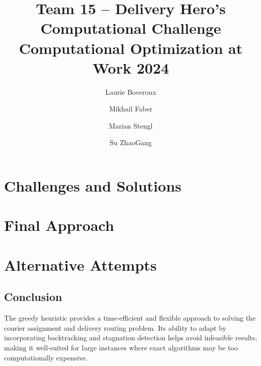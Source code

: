 \documentclass[a4paper]{article}
\title{Team 15 -- Delivery Hero's Computational Challenge \\[0.75em] \Large Computational Optimization at Work 2024}
\author{Laurie Boveroux \and
        Mikhail Faber\and
        Marian Stengl\and
        Su ZhaoGang}
\newcommand\path{.}
\begin{document}
%
\maketitle%

\section{Challenges and Solutions}%
%
\section{Final Approach}%
%
\section{Alternative Attempts}%
%
\subsection{Conclusion}
The greedy heuristic provides a time-efficient and flexible approach to solving the courier assignment and delivery routing problem. Its ability to adapt by incorporating backtracking and stagnation detection helps avoid infeasible results, making it well-suited for large instances where exact algorithms may be too computationally expensive.
\end{document}
